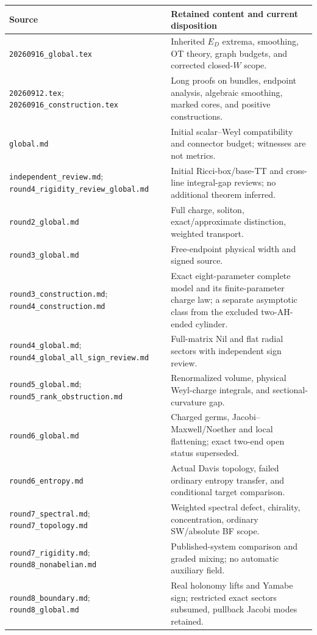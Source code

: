 \documentclass[11pt]{article}
\theoremstyle{definition}\newtheorem{problem}[theorem]{Open problem}
\theoremstyle{remark}\newtheorem{remark}[theorem]{Scope}
\numberwithin{equation}{section}
\begin{document}
\begin{longtable}{L{.34\textwidth}L{.57\textwidth}}
\toprule Source & Retained content and current disposition\\\midrule\endhead
\nolinkurl{20260916_global.tex} & Inherited $E_D$ extrema, smoothing, OT theory, graph budgets, and corrected closed-$W$ scope.\\
\nolinkurl{20260912.tex}; \nolinkurl{20260916_construction.tex} & Long proofs on bundles, endpoint analysis, algebraic smoothing, marked cores, and positive constructions.\\
\nolinkurl{global.md} & Initial scalar--Weyl compatibility and connector budget; witnesses are not metrics.\\
\nolinkurl{independent_review.md}; \nolinkurl{round4_rigidity_review_global.md} & Initial Ricci-box/base-TT and cross-line integral-gap reviews; no additional theorem inferred.\\
\nolinkurl{round2_global.md} & Full charge, soliton, exact/approximate distinction, weighted transport.\\
\nolinkurl{round3_global.md} & Free-endpoint physical width and signed source.\\
\nolinkurl{round3_construction.md}; \nolinkurl{round4_construction.md} & Exact eight-parameter complete model and its finite-parameter charge law; a separate asymptotic class from the excluded two-AH-ended cylinder.\\
\nolinkurl{round4_global.md}; \nolinkurl{round4_global_all_sign_review.md} & Full-matrix Nil and flat radial sectors with independent sign review.\\
\nolinkurl{round5_global.md}; \nolinkurl{round5_rank_obstruction.md} & Renormalized volume, physical Weyl-charge integrals, and sectional-curvature gap.\\
\nolinkurl{round6_global.md} & Charged germs, Jacobi--Maxwell/Noether and local flattening; exact two-end open status superseded.\\
\nolinkurl{round6_entropy.md} & Actual Davis topology, failed ordinary entropy transfer, and conditional target comparison.\\
\nolinkurl{round7_spectral.md}; \nolinkurl{round7_topology.md} & Weighted spectral defect, chirality, concentration, ordinary SW/absolute BF scope.\\
\nolinkurl{round7_rigidity.md}; \nolinkurl{round8_nonabelian.md} & Published-system comparison and graded mixing; no automatic auxiliary field.\\
\nolinkurl{round8_boundary.md}; \nolinkurl{round8_global.md} & Real holonomy lifts and Yamabe sign; restricted exact sectors subsumed, pullback Jacobi modes retained.\\

\end{longtable}
\end{document}
